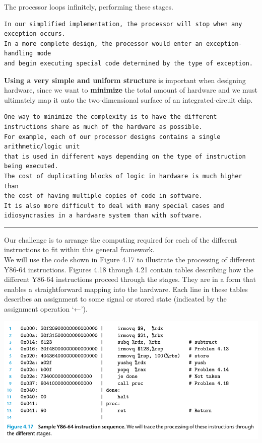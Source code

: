 \documentclass[11pt]{article}
\begin{document}
The processor loops infinitely, performing these stages.\\
\begin{verbatim}
In our simplified implementation, the processor will stop when any exception occurs.
In a more complete design, the processor would enter an exception-handling mode 
and begin executing special code determined by the type of exception.
\end{verbatim}

\textbf{Using a very simple and uniform structure} is important when designing hardware, since we want to \textbf{minimize} the total amount of hardware and we must ultimately map it onto the two-dimensional surface of an integrated-circuit chip.\\

\begin{verbatim}
One way to minimize the complexity is to have the different instructions share as much of the hardware as possible. 
For example, each of our processor designs contains a single arithmetic/logic unit 
that is used in different ways depending on the type of instruction being executed. 
The cost of duplicating blocks of logic in hardware is much higher than 
the cost of having multiple copies of code in software. 
It is also more difficult to deal with many special cases and idiosyncrasies in a hardware system than with software.
\end{verbatim}

\noindent\rule{\textwidth}{0.5pt}
Our challenge is to arrange the computing required for each of the different instructions to fit within this general framework.\\
We will use the code shown in Figure 4.17 to illustrate the processing of different Y86-64 instructions. Figures 4.18 through 4.21 contain tables describing how the different Y86-64 instructions proceed through the stages. They are in a form that enables a straightforward mapping into the hardware. Each line in these tables describes an assignment to some signal or stored state (indicated by the assignment operation ‘←’).\\

\begin{center}
\includegraphics[width=.9\linewidth]{pics/figure4.17-sample-y86-64-instruction-sequence.png}
\end{center}
\end{document}
